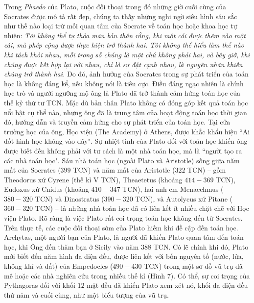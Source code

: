 	\begin{multicols}{2}
	Trong \textit{Phaedo} của Plato, cuộc đối thoại trong đó những giờ cuối cùng của Socrates được mô tả rất đẹp, chúng ta thấy những nghi ngờ siêu hình sâu sắc như thế nào loại trừ mối quan tâm của Socrate về toán học hoặc khoa học tự nhiên:
	\vskip 0.1cm
	\textit{Tôi không thể tự thỏa mãn bản thân rằng, khi một cái được thêm vào một cái, mà phép cộng được thực hiện trở thành hai. 
	\vskip 0.1cm
	Tôi không thể hiểu làm thế nào khi tách khỏi nhau, mỗi trong số chúng là một chứ không phải hai, và bây giờ, khi chúng được kết hợp lại với nhau, chỉ là sự đặt cạnh nhau, là nguyên nhân khiến chúng trở thành hai.}
	\vskip 0.1cm
	Do đó, ảnh hưởng của Socrates trong sự phát triển của toán học là không đáng kể, nếu không nói là tiêu cực. Điều đáng ngạc nhiên là chính học trò và người ngưỡng mộ ông là Plato đã trở thành cảm hứng toán học của thế kỷ thứ tư TCN. 
	\vskip 0.1cm
	Mặc dù bản thân Plato không có đóng góp kết quả toán học nổi bật cụ thể nào, nhưng ông đã là trung tâm của hoạt động toán học thời gian đó, hướng dẫn và truyền cảm hứng cho sự phát triển của toán học. Tại cửa trường học của ông, Học viện (The Academy) ở Athens, được khắc khẩu hiệu ``Ai dốt hình học không vào đây".
	\vskip 0.1cm
	\vskip 0.1cm
	Sự nhiệt tình của Plato đối với toán học khiến ông được biết đến không phải với tư cách là một nhà toán học, mà là ``người tạo ra các nhà toán học".
	\vskip 0.1cm
	Sáu nhà toán học (ngoài Plato và Aristotle) sống giữa năm mất của Socrates ($399$ TCN) và năm mất của Aristotle ($322$ TCN) -- gồm Theodorus xứ Cyrene (thế kỉ V TCN), Theaetetus (khoảng $414-369$ TCN), Eudoxus xứ Cnidus (khoảng $410-347$ TCN), hai anh em Menaechmus ($380-320$ TCN) và Dinostratus ($390-320$  TCN), và Autolycus xứ Pitane ($360-320$ TCN) -- là những nhà toán học đã có liên kết ít nhiều chặt chẽ với Học viện Plato.
	\vskip 0.1cm
	Rõ ràng là việc Plato rất coi trọng toán học không đến từ Socrates. Trên thực tế, các cuộc đối thoại sớm của Plato hiếm khi đề cập đến toán học.  Archytas, một người bạn của Plato, là người đã khiến Plato quan tâm đến toán học, khi Ông đến thăm bạn ở Sicily vào năm $388$ TCN. Có lẽ chính khi đó, Plato mới biết đến năm hình đa diện đều, được liên kết với bốn nguyên tố (nước, lửa, không khí và đất) của Empedocles ($490-430$ TCN) trong một sơ đồ vũ trụ đã mê hoặc các nhà nghiên cứu trong nhiều thế kỉ (Hình $7$). 
	\vskip 0.1cm
	Có thể, sự coi trọng của Pythagoras đối với khối $12$ mặt đều đã khiến Plato xem xét nó, khối đa diện đều thứ năm và cuối cùng, như một biểu tượng của vũ trụ. 

\end{multicols}
